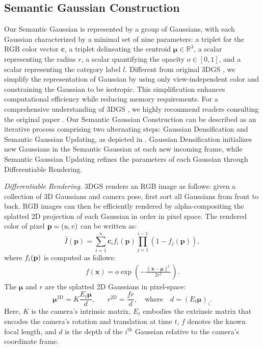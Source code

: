 \subsection{Semantic Gaussian Construction}

Our Semantic Gaussian is represented by a group of Gaussians, with each Gaussian characterized by a minimal set of nine parameters: a triplet for the RGB color vector $\mathbf{c}$, a triplet delineating the centroid $\bm{\mu} \in \mathbb{R}^3$, a scalar representing the radius $r$, a scalar quantifying the opacity $o \in [0,1]$, and a scalar representing the category label $l$. Different from original 3DGS \cite{kerbl3Dgaussians}, we simplify the representation of Gaussian by using only view-independent color and constraining the Gaussian to be isotropic. This simplification enhances computational efficiency while reducing memory requirements. For a comprehensive understanding of 3DGS \cite{kerbl3Dgaussians}, we highly recommend readers consulting the original paper \cite{kerbl3Dgaussians}. Our Semantic Gaussian Construction can be described as an iterative process comprising two alternating steps: Gaussian Densification and Semantic Gaussian Updating, as depicted in . Gaussian Densification initializes new Gaussians in the Semantic Gaussian at each new incoming frame, while Semantic Gaussian Updating refines the parameters of each Gaussian through Differentiable Rendering.

\textit{Differentiable Rendering.} 3DGS \cite{kerbl3Dgaussians} renders an RGB image as follows: given a collection of 3D Gaussians and camera pose, first sort all Gaussians from front to back. RGB images can then be efficiently rendered by alpha-compositing the splatted 2D projection of each Gaussian in order in pixel space. The rendered color of pixel ${\bf p} = (u,v)$ can be written as:
\begin{equation}
\hat{I}(\mathbf{p}) = \sum_{i=1}^{n} \mathbf{c}_i f_i(\mathbf{p}) \prod_{j=1}^{i-1} (1 - f_j(\mathbf{p})),
\end{equation}
where $f_i(\bf{p})$ is computed as follows:
\begin{align}
    f(\mathbf{x}) = o \exp\left(-\frac{\|\mathbf{x} - \boldsymbol{\mu}\|^2}{2r^2}\right).\label{eq:gauss}
\end{align}
The $\boldsymbol{\mu}$ and $r$ are the splatted 2D Gaussians in pixel-space: 
\begin{equation}
    \boldsymbol{\mu}^{\textrm{2D}} = K \frac{E_t \boldsymbol{\mu}}{d}, \;\;\;\;\;\;
r^{\textrm{2D}} = \frac{f r}{d}, %
\quad \text{where} \quad d = (E_t \boldsymbol{\mu})_z.
\end{equation}
Here, $K$ is the camera's intrinsic matrix, $E_t$ embodies the extrinsic matrix that encodes the camera's rotation and translation at time $t$,  $f$ denotes the known focal length, and $d$ is the depth of the $i^{\text{th}}$ Gaussian relative to the camera's coordinate frame. 

